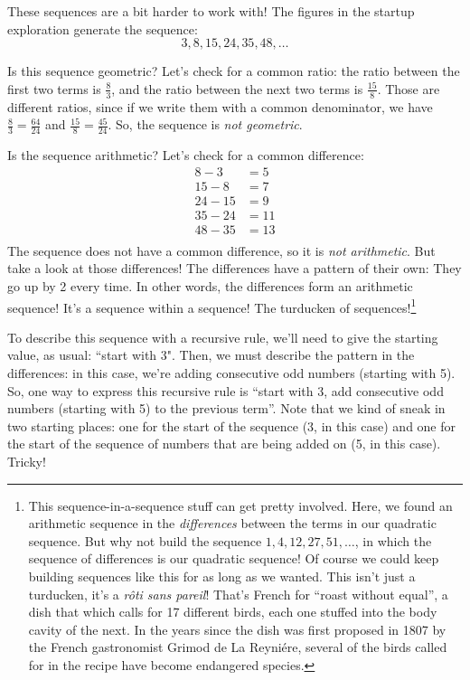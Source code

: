 These sequences are a bit harder to work with! The figures in the startup exploration generate the sequence: \[3, 8, 15, 24, 35, 48, \dotsc\]

Is this sequence geometric? Let's check for a common ratio: the ratio between the first two terms is $\frac{8}{3}$, and the ratio between the next two terms is $\frac{15}{8}$. Those are different ratios, since if we write them with a common denominator, we have $\frac{8}{3}=\frac{64}{24}$ and $\frac{15}{8}=\frac{45}{24}$. So, the sequence is \textit{not geometric}.

Is the sequence arithmetic? Let's check for a common difference:
\[\begin{aligned}
8-3 &=5\\
15-8 &=7\\
24-15 &=9\\
35-24 &=11\\
48-35 &=13\\
\end{aligned}\]
The sequence does not have a common difference, so it is \textit{not arithmetic}. But take a look at those differences! The differences have a pattern of their own: They go up by 2 every time. In other words, the differences form an arithmetic sequence! It's a sequence within a sequence! The turducken of sequences!\footnote{This sequence-in-a-sequence stuff can get pretty involved. Here, we found an arithmetic sequence in the \textit{differences} between the terms in our quadratic sequence. But why not build the sequence $1, 4, 12, 27, 51, \dotsc$, in which the sequence of differences is our quadratic sequence! Of course we could keep building sequences like this for as long as we wanted. This isn't just a turducken, it's a \textit{r\^oti sans pareil}! That's French for ``roast without equal'', a dish that which calls for 17 different birds, each one stuffed into the body cavity of the next. In the years since the dish was first proposed in 1807 by the French gastronomist Grimod de La Reyni\'ere, several of the birds called for in the recipe have become endangered species.}

To describe this sequence with a recursive rule, we'll need to give the starting value, as usual: ``start with 3". Then, we must describe the pattern in the differences: in this case, we're adding consecutive odd numbers (starting with 5). So, one way to express this recursive rule is ``start with 3, add consecutive odd numbers (starting with 5) to the previous term''. Note that we kind of sneak in two starting places: one for the start of the sequence (3, in this case) and one for the start of the sequence of numbers that are being added on (5, in this case). Tricky!


